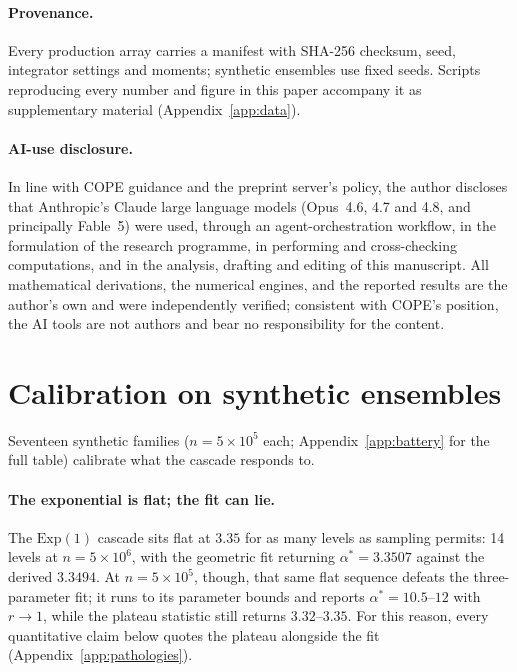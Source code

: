 \documentclass[11pt,a4paper]{article}
\theoremstyle{remark}
\newcommand{\Exp}{\mathrm{Exp}}
\begin{document}
\paragraph{Provenance.} Every production array carries a manifest with SHA-256 checksum, seed,
integrator settings and moments; synthetic ensembles use fixed seeds. Scripts reproducing every
number and figure in this paper accompany it as supplementary material (Appendix~\ref{app:data}).

\paragraph{AI-use disclosure.} In line with COPE guidance and the preprint server's policy, the author
discloses that Anthropic's Claude large language models (Opus~4.6, 4.7 and 4.8, and principally
Fable~5) were used, through an agent-orchestration workflow, in the formulation of the research
programme, in performing and cross-checking computations, and in the analysis, drafting and editing of
this manuscript. All mathematical derivations, the numerical engines, and the reported results are the
author's own and were independently verified; consistent with COPE's position, the AI tools are not
authors and bear no responsibility for the content.

\section{Calibration on synthetic ensembles}\label{sec:calibration}

Seventeen synthetic families ($n = 5\times10^{5}$ each; Appendix~\ref{app:battery} for the full
table) calibrate what the cascade responds to.

\paragraph{The exponential is flat; the fit can lie.} The $\Exp(1)$ cascade sits flat at $3.35$ for
as many levels as sampling permits: 14 levels at $n=5\times10^{6}$, with the geometric fit returning
$\alpha^* = 3.3507$ against the derived $3.3494$. At $n=5\times10^{5}$, though, that same flat
sequence defeats the three-parameter fit; it runs to its parameter bounds and reports
$\alpha^* = 10.5$--$12$ with $r \to 1$, while the plateau statistic still returns $3.32$--$3.35$. For
this reason, every quantitative claim below quotes the plateau alongside the fit
(Appendix~\ref{app:pathologies}).
\end{document}
